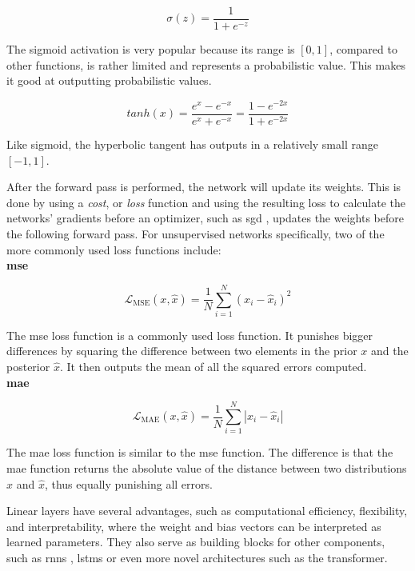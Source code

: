 \begin{equation}
    \sigma(z) = \frac{1} {1 + e^{-z}}
\end{equation}

The sigmoid activation is very popular because its range is $[0,1]$, compared to other functions, is rather limited and represents a probabilistic value. This makes it good at outputting probabilistic values.

\begin{equation}
    tanh(x) = \frac{e^x - e^{-x}}{e^x + e^{-x}} = \frac{1 - e^{-2x}}{1 + e^{-2x}}
\end{equation}

Like sigmoid, the hyperbolic tangent has outputs in a relatively small range $[-1, 1]$.

After the forward pass is performed, the network will update its weights. This is done by using a \textit{cost}, or \textit{loss} function and using the resulting loss to calculate the networks' gradients before an optimizer, such as \acrfull{sgd} \cite{Rumelhart1986, Bottou2012}, updates the weights before the following forward pass. For unsupervised networks specifically, two of the more commonly used loss functions include: \\

\textbf{\acrfull{mse}}

\begin{equation}\label{eq:mse}
    \mathcal{L}_{\text{MSE}}(x, \hat{x}) = \dfrac{1}{N}  \sum_{i=1}^{N}(x_i-\hat{x}_i)^2
\end{equation}

The \acrshort{mse} loss function is a commonly used loss function. It punishes bigger differences by squaring the difference between two elements in the prior $x$ and the posterior $\hat{x}$. It then outputs the mean of all the squared errors computed. \\

\textbf{\acrfull{mae}}

\begin{equation}\label{eq:mae}
    \mathcal{L}_{\text{MAE}}(x, \hat{x}) = \dfrac{1}{N}  \sum_{i=1}^{N}|x_i-\hat{x}_i|
\end{equation}

The \acrshort{mae} loss function is similar to the \acrshort{mse} function. The difference is that the \acrshort{mae} function returns the absolute value of the distance between two distributions $x$ and $\hat{x}$, thus equally punishing all errors.

Linear layers have several advantages, such as computational efficiency, flexibility, and interpretability, where the weight and bias vectors can be interpreted as learned parameters. They also serve as building blocks for other components, such as \acrshort{rnn}s \cite{schmidt2019recurrent}, \acrshort{lstm}s \cite{lstm} or even more novel architectures such as the transformer\cite{vaswani2017attention}. 

